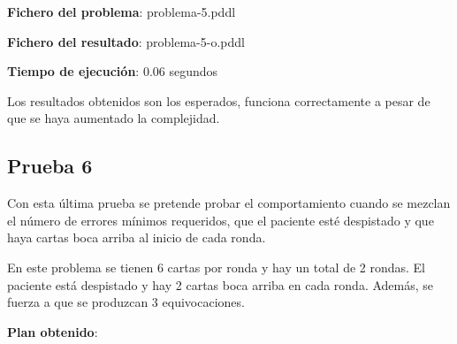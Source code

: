 \documentclass{uc3mpracticas}
\begin{document}
    \vspace{2mm}

    \textbf{Fichero del problema}: problema-5.pddl

    \textbf{Fichero del resultado}: problema-5-o.pddl

    \textbf{Tiempo de ejecución}: 0.06 segundos

    \vspace{3mm}

  Los resultados obtenidos son los esperados, funciona correctamente a pesar de que se haya aumentado la complejidad.



  \subsection{Prueba 6}

  Con esta última prueba se pretende probar el comportamiento cuando se mezclan el número de errores mínimos requeridos, que el paciente esté despistado y que haya cartas boca arriba al inicio de cada ronda.

  \vspace{3mm}

  En este problema se tienen 6 cartas por ronda y hay un total de 2 rondas. El paciente está despistado y hay 2 cartas boca arriba en cada ronda. Además, se fuerza a que se produzcan 3 equivocaciones.

  \vspace{3mm}

    \textbf{Plan obtenido}:
\end{document}
